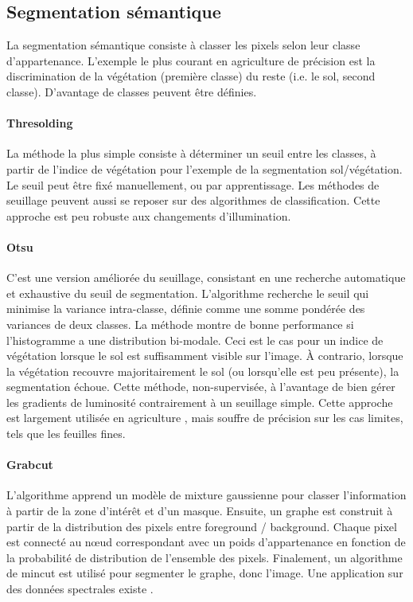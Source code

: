 \documentclass[../thesis.tex]{subfiles}
\begin{document}
    \subsection{Segmentation sémantique}
    
    La segmentation sémantique consiste à classer les pixels selon leur classe d'appartenance. L'exemple le plus courant en agriculture de précision est la discrimination de la végétation (première classe) du reste (i.e. le sol, second classe). D'avantage de classes peuvent être définies. %
    
    \paragraph{Thresolding} La méthode la plus simple consiste à déterminer un seuil entre les classes, à partir de l'indice de végétation pour l'exemple de la segmentation sol/végétation. Le seuil peut être fixé manuellement, ou par apprentissage. Les méthodes de seuillage peuvent aussi se reposer sur des algorithmes de classification. Cette approche est peu robuste aux changements d'illumination.
    
    \paragraph{Otsu} C'est une version améliorée du seuillage, consistant en une recherche automatique et exhaustive du seuil de segmentation. L'algorithme recherche le seuil qui minimise la variance intra-classe, définie comme une somme pondérée des variances de deux classes. La méthode montre de bonne performance si l'histogramme a une distribution bi-modale. Ceci est le cas pour un indice de végétation lorsque le sol est suffisamment visible sur l'image. À contrario, lorsque la végétation recouvre majoritairement le sol (ou lorsqu'elle est peu présente), la segmentation échoue. Cette méthode, non-supervisée, à l'avantage de bien gérer les gradients de luminosité contrairement à un seuillage simple. Cette approche est largement utilisée en agriculture \cite{Sa2017}, mais souffre de précision sur les cas limites, tels que les feuilles fines.
    
    \paragraph{Grabcut} L'algorithme apprend un modèle de mixture gaussienne pour classer l'information à partir de la zone d'intérêt et d'un masque. Ensuite, un graphe est construit à partir de la distribution des pixels entre foreground / background. Chaque pixel est connecté au nœud correspondant avec un poids d'appartenance en fonction de la probabilité de distribution de l'ensemble des pixels. Finalement, un algorithme de mincut est utilisé pour segmenter le graphe, donc l'image. Une application sur des données spectrales existe \cite{estrada2004spectral}.
    
\end{document}

